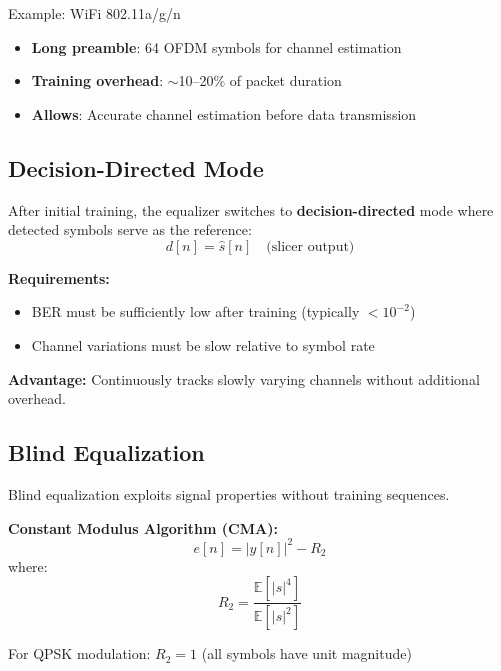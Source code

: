 \begin{calloutbox}{Example: WiFi 802.11a/g/n}
\begin{itemize}
\item \textbf{Long preamble}: 64 OFDM symbols for channel estimation
\item \textbf{Training overhead}: $\sim$10--20\% of packet duration
\item \textbf{Allows}: Accurate channel estimation before data transmission
\end{itemize}
\end{calloutbox}

\subsection{Decision-Directed Mode}

After initial training, the equalizer switches to \textbf{decision-directed} mode where detected symbols serve as the reference:
\begin{equation}
d[n] = \hat{s}[n] \quad \text{(slicer output)}
\label{eq:decision-directed}
\end{equation}

\textbf{Requirements:}
\begin{itemize}
\item BER must be sufficiently low after training (typically $< 10^{-2}$)
\item Channel variations must be slow relative to symbol rate
\end{itemize}

\textbf{Advantage:} Continuously tracks slowly varying channels without additional overhead.

\subsection{Blind Equalization}

Blind equalization exploits signal properties without training sequences.

\textbf{Constant Modulus Algorithm (CMA):}
\begin{equation}
e[n] = |y[n]|^2 - R_2
\label{eq:cma-error}
\end{equation}
where:
\begin{equation}
R_2 = \frac{\mathbb{E}[|s|^4]}{\mathbb{E}[|s|^2]}
\label{eq:cma-r2}
\end{equation}

For QPSK modulation: $R_2 = 1$ (all symbols have unit magnitude)

